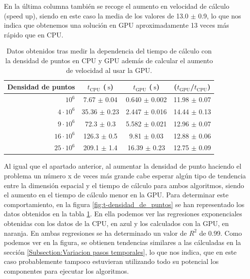 \documentclass[11pt,a4paper,twoside,pdf]{article}
\numberwithin{equation}{section}
\begin{document}
En la última columna también se recoge el aumento en velocidad de cálculo (speed up), siendo en este caso la media de los valores de 13.0 $\pm$ 0.9, lo que nos indica que obtenemos una solución en GPU aproximadamente 13 veces más rápido que en CPU.

\begin{table}[h]
    \centering
    \begin{tabular}{|r|c|c|c|}
    \hline
    Densidad de puntos &  $t_\text{CPU}$ ($\SI{}{\second}$)  & $t_\text{GPU}$ ($\SI{}{\second}$) &  ($t_\text{GPU}$/$t_\text{CPU}$)  \\ \hline \hline
     $10^6$ & 7.67 $\pm$ 0.04         & 0.640 $\pm$ 0.002 & 11.98 $\pm$ 0.07\\ \hline
     $4\cdot 10^6$ & 35.36 $\pm$ 0.23 & 2.447 $\pm$ 0.016 & 14.44 $\pm$ 0.13\\ \hline
     $9\cdot 10^6$ & 72.3 $\pm$ 0.3   & 5.582 $\pm$ 0.021   & 12.96 $\pm$ 0.07\\ \hline
     $16\cdot 10^6$ & 126.3 $\pm$ 0.5 & 9.81 $\pm$ 0.03   & 12.88 $\pm$ 0.06\\ \hline
     $25\cdot 10^6$ & 209.1 $\pm$ 1.4 & 16.39 $\pm$ 0.23 & 12.75 $\pm$ 0.09\\ \hline
    \end{tabular}
    \caption{Datos obtenidos tras medir la dependencia del tiempo de cálculo con la densidad de puntos en CPU y GPU además de calcular el aumento de velocidad al usar la GPU.}
    \label{tab:t_densidad_de_punto}
\end{table}


Al igual que el apartado anterior, al aumentar la densidad de punto haciendo el problema un número x de veces más grande cabe esperar algún tipo de tendencia entre la dimensión espacial y el tiempo de cálculo para ambos algoritmos, siendo el aumento en el tiempo de cálculo menor en la GPU. Para determinar este comportamiento, en la figura \ref{fig:t-densidad_de_puntos} se han representado los datos obtenidos en la tabla \ref{tab:t_densidad_de_punto}. En ella podemos ver las regresiones exponenciales obtenidas con los datos de la CPU, en azul y los calculados con la GPU, en naranja. En ambas regresiones se ha determinado un valor de $R^2$ de 0.99. Como podemos ver en la figura, se obtienen tendencias similares a las cálculadas en la sección \ref{Subsection:Variacion pasos temporales}, lo que nos indica, que en este caso probablemente tampoco estuvieran utilizando todo su potencial los componentes para ejecutar los algoritmos.
\end{document}
